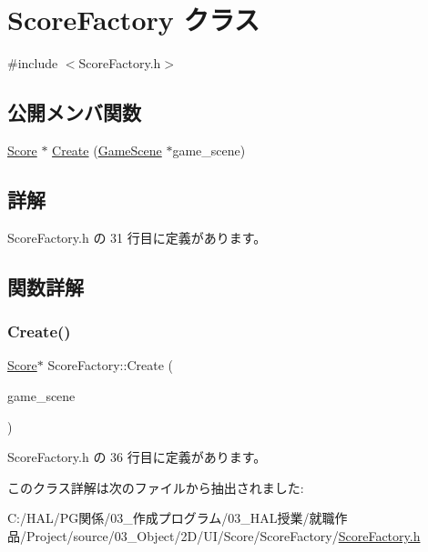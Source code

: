 \hypertarget{class_score_factory}{}\section{Score\+Factory クラス}
\label{class_score_factory}


{\ttfamily \#include $<$Score\+Factory.\+h$>$}

\subsection*{公開メンバ関数}
\begin{DoxyCompactItemize}
\item 
\mbox{\hyperlink{class_score}{Score}} $\ast$ \mbox{\hyperlink{class_score_factory_a1c3047d657151d5bbda8157a743b154d}{Create}} (\mbox{\hyperlink{class_game_scene}{Game\+Scene}} $\ast$game\+\_\+scene)
\end{DoxyCompactItemize}


\subsection{詳解}


 Score\+Factory.\+h の 31 行目に定義があります。



\subsection{関数詳解}
\mbox{\label{class_score_factory_a1c3047d657151d5bbda8157a743b154d}} 
\subsubsection{\texorpdfstring{Create()}{Create()}}
{\footnotesize\ttfamily \mbox{\hyperlink{class_score}{Score}}$\ast$ Score\+Factory\+::\+Create (\begin{DoxyParamCaption}\item[{\mbox{\hyperlink{class_game_scene}{Game\+Scene}} $\ast$}]{game\+\_\+scene }\end{DoxyParamCaption})\hspace{0.3cm}{\ttfamily [inline]}}



 Score\+Factory.\+h の 36 行目に定義があります。



このクラス詳解は次のファイルから抽出されました\+:\begin{DoxyCompactItemize}
\item 
C\+:/\+H\+A\+L/\+P\+G関係/03\+\_\+作成プログラム/03\+\_\+\+H\+A\+L授業/就職作品/\+Project/source/03\+\_\+\+Object/2\+D/\+U\+I/\+Score/\+Score\+Factory/\mbox{\hyperlink{_score_factory_8h}{Score\+Factory.\+h}}\end{DoxyCompactItemize}
